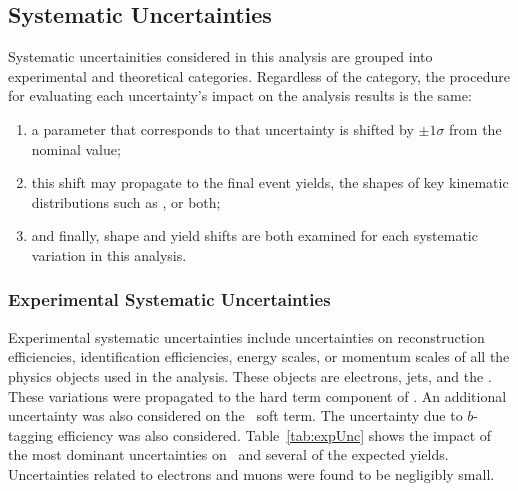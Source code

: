 \subsection{Systematic Uncertainties}
\label{sec:systsUnc}
\par Systematic uncertainities considered in this analysis are grouped into 
 experimental and theoretical categories. Regardless of the category, the procedure for evaluating 
each uncertainty's impact on the analysis results is the same:
\begin{enumerate}
\item  a parameter that corresponds to that uncertainty is shifted by $\pm 1\sigma$ from the 
nominal value; 
\item this shift may propagate to the final event yields, 
the shapes of key kinematic distributions such as \mT, or both; 
\item and finally, shape 
and yield shifts are both examined for each systematic variation in this analysis.  
\end{enumerate}

\subsubsection{Experimental Systematic Uncertainties}
\par Experimental systematic uncertainties include uncertainties on reconstruction efficiencies, 
identification efficiencies, energy scales, or momentum scales of all the physics objects 
used in the analysis. These objects are electrons, jets, and the \tauvis. These variations were propagated 
to the hard term component of \met. An additional uncertainty was also considered on the \met\ soft 
term. The uncertainty due to $b$-tagging efficiency was also considered. Table~\ref{tab:expUnc} 
shows the impact of the most dominant uncertainties on \ttbar\ and several of the expected yields. 
Uncertainties related to electrons and muons were found to be negligibly small. 

